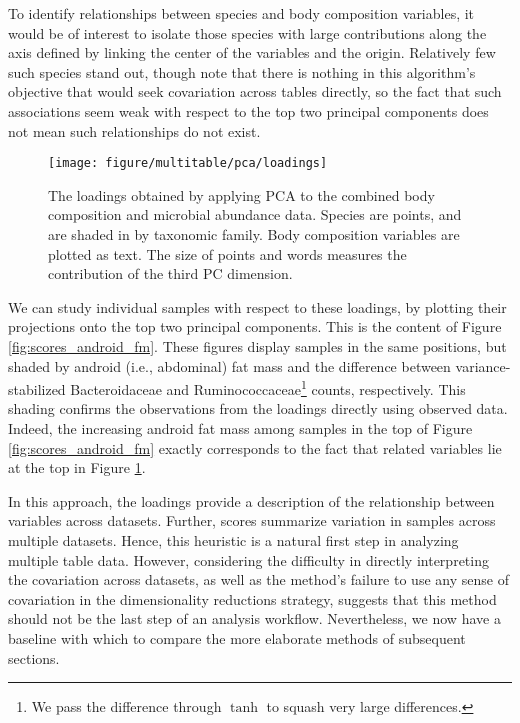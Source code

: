 \documentclass[utf8]{frontiersFPHY} %
\begin{document}
To identify relationships between species and body composition variables, it
would be of interest to isolate those species with large contributions along the
axis defined by linking the center of the variables and the origin. Relatively
few such species stand out, though note that there is nothing in this
algorithm's objective that would seek covariation across tables directly, so the
fact that such associations seem weak with respect to the top two principal
components does not mean such relationships do not exist.

\begin{figure}
  \centering \texttt{[image: figure/multitable/pca/loadings]}
  \caption{The loadings obtained by applying PCA to the combined body
    composition and microbial abundance data. Species are points, and are shaded
    in by taxonomic family. Body composition variables are plotted as text. The
    size of points and words measures the contribution of the third PC
    dimension. \label{fig:loadings} }
\end{figure}

We can study individual samples with respect to these loadings, by plotting
their projections onto the top two principal components. This is the content of
Figure \ref{fig:scores_android_fm}. These figures display samples in the same
positions, but shaded by android (i.e., abdominal) fat mass and the difference
between variance-stabilized Bacteroidaceae and Ruminococcaceae\footnote{We pass
  the difference through $\tanh$ to squash very large differences.} counts,
respectively. This shading confirms the observations from the loadings directly
using observed data. Indeed, the increasing android fat mass among samples in
the top of Figure \ref{fig:scores_android_fm} exactly corresponds to the fact
that related variables lie at the top in Figure \ref{fig:loadings}.

In this approach, the loadings provide a description of the relationship between
variables across datasets. Further, scores summarize variation in samples across
multiple datasets. Hence, this heuristic is a natural first step in analyzing
multiple table data. However, considering the difficulty in directly
interpreting the covariation across datasets, as well as the method's failure to
use any sense of covariation in the dimensionality reductions strategy, suggests
that this method should not be the last step of an analysis workflow.
Nevertheless, we now have a baseline with which to compare the more elaborate
methods of subsequent sections.
\end{document}

